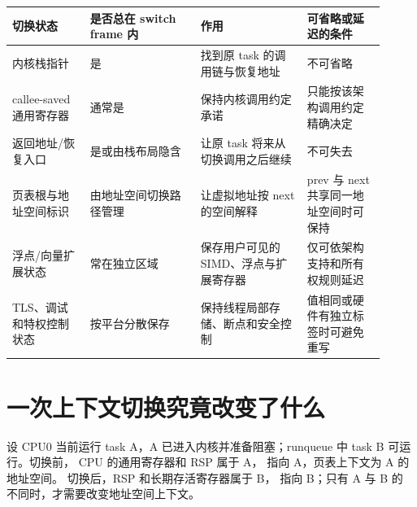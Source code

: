 \begin{longtable}{|L{0.19\linewidth}|L{0.27\linewidth}|L{0.26\linewidth}|L{0.19\linewidth}|}
\hline
切换状态 & 是否总在 switch frame 内 & 作用 & 可省略或延迟的条件 \\ \hline
内核栈指针 & 是 & 找到原 task 的调用链与恢复地址 & 不可省略 \\ \hline
callee-saved 通用寄存器 & 通常是 & 保持内核调用约定承诺 & 只能按该架构调用约定精确决定 \\ \hline
返回地址/恢复入口 & 是或由栈布局隐含 & 让原 task 将来从切换调用之后继续 & 不可失去 \\ \hline
页表根与地址空间标识 & 由地址空间切换路径管理 & 让虚拟地址按 next 的空间解释 & prev 与 next 共享同一地址空间时可保持 \\ \hline
浮点/向量扩展状态 & 常在独立区域 & 保存用户可见的 SIMD、浮点与扩展寄存器 & 仅可依架构支持和所有权规则延迟 \\ \hline
TLS、调试和特权控制状态 & 按平台分散保存 & 保持线程局部存储、断点和安全控制 & 值相同或硬件有独立标签时可避免重写 \\ \hline
\end{longtable}
\section{一次上下文切换究竟改变了什么}

设 CPU0 当前运行 task A，A 已进入内核并准备阻塞；runqueue 中 task B 可运行。切换前，
CPU 的通用寄存器和 RSP 属于 A， 指向 A，页表上下文为 A 的地址空间。
切换后，RSP 和长期存活寄存器属于 B， 指向 B；只有 A 与 B 的
 不同时，才需要改变地址空间上下文。

